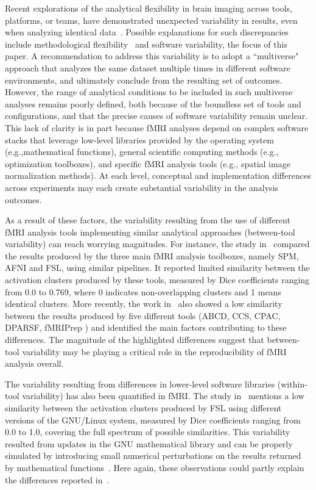 \documentclass[11pt,onecolumn]{article}
\begin{document}
Recent explorations of the analytical flexibility in brain imaging across
tools, platforms, or teams, have demonstrated unexpected variability in
results, even when analyzing identical data~\cite{botvinik2020variability}. Possible explanations for
such discrepancies include methodological flexibility~\cite{carp2012plurality} and software
variability, the focus of this paper. A recommendation to address this
variability is to adopt a ``multiverse" approach that analyzes the same
dataset multiple times in different software environments, and ultimately
conclude from the resulting set of outcomes. However, the range of
analytical conditions to be included in such multiverse analyses remains
poorly defined, both because of the boundless set of tools and
configurations, and that the precise causes of software variability remain
unclear. This lack of clarity is in part because fMRI analyses depend on
complex software stacks that leverage low-level libraries provided by the
operating system (e.g.,mathematical functions), general scientific
computing methods (e.g., optimization toolboxes), and specific fMRI
analysis tools (e.g., spatial image normalization methods). At each level,
conceptual and implementation differences across experiments may each
create substantial variability in the analysis outcomes.

As a result of these factors, the variability resulting from the use of
different fMRI analysis tools implementing similar analytical approaches
(between-tool variability) can reach worrying magnitudes. For instance, the
study in~\cite{bowring2019exploring} compared the results produced by the
three main fMRI analysis toolboxes, namely SPM, AFNI and FSL, using similar
pipelines. It reported limited similarity between the activation clusters
produced by these tools, measured by Dice coefficients ranging from 0.0 to
0.769, where 0 indicates non-overlapping
clusters and 1 means identical clusters. More recently, the work
in~\cite{Li2021.12.01.470790} also showed a low similarity between the
results produced by five different tools (ABCD, CCS, CPAC, DPARSF, fMRIPrep
) and identified the main
factors contributing to these differences. The magnitude of the highlighted
differences suggest that between-tool variability may be playing a critical
role in the reproducibility of fMRI analysis overall. 

The variability resulting from differences in lower-level software
libraries (within-tool variability) has also been quantified in fMRI. The
study in~\cite{Glatard2015} mentions a low similarity between the activation clusters
produced by FSL using different versions of the GNU/Linux system, measured
by Dice coefficients ranging from 0.0 to 1.0, covering the full spectrum of
possible similarities. This variability resulted from updates in the GNU
mathematical library and can be properly simulated by introducing small
numerical perturbations on the results returned by mathematical functions~\cite{salari2021accurate}.
Here again, these observations could partly explain the differences
reported in~\cite{botvinik2020variability}.
\end{document}
